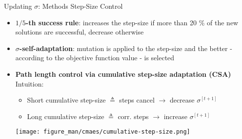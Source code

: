 \documentclass[11pt,compress,t,notes=noshow, xcolor=table]{beamer}
\begin{document}
%
%
%
%



\begin{vbframe}{Updating $\sigma$: Methods Step-Size Control}
\begin{itemize}
\setlength\itemsep{1.0em}
\item \textbf{$1/5$-th success rule}: increases the step-size if more than 20 \% of the new solutions are successful, decrease otherwise
\item \textbf{$\sigma$-self-adaptation}: mutation is applied to the step-size and the better - according to the objective function value - is selected
\item \textbf{Path length control via cumulative step-size adaptation (CSA)}\\ Intuition:
\begin{itemize}
    \item Short cumulative step-size $\triangleq$ steps cancel $\to$ decrease $\sigma^{[t+1]}$ 
    \item Long cumulative step-size $\triangleq$ corr. steps $\to$ increase $\sigma^{[t+1]}$ 
\end{itemize}
\vspace{0.3cm}
\begin{center}
\texttt{[image: figure\_man/cmaes/cumulative-step-size.png]}
\end{center}

\end{itemize}
\end{vbframe}
\end{document}

